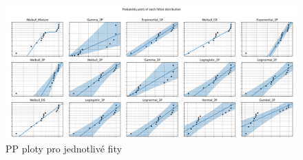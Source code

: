 \documentclass[a4, 11pt]{article}
\theoremstyle{definition}
\theoremstyle{remark}
\begin{document}
	\begin{figure}[H]
		\centering
		\includegraphics[width=0.9\linewidth]{img/fiteverything_placebo_PP_plots.png}
		\caption{PP ploty pro jednotlivé fity}
		\label{fig:fit_everything_placebo_PP_plots}
	\end{figure}
    
\end{document}
